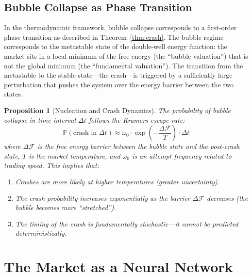 \documentclass[12pt,a4paper]{article}
\newtheorem{proposition}[theorem]{Proposition}
\theoremstyle{definition}
\newcommand{\Prob}{\mathbb{P}}
\begin{document}
\subsection{Bubble Collapse as Phase Transition}

In the thermodynamic framework, bubble collapse corresponds to a first-order phase transition as described in Theorem~\ref{thm:crash}. The bubble regime corresponds to the metastable state of the double-well energy function: the market sits in a local minimum of the free energy (the ``bubble valuation'') that is not the global minimum (the ``fundamental valuation''). The transition from the metastable to the stable state---the crash---is triggered by a sufficiently large perturbation that pushes the system over the energy barrier between the two states.

\begin{proposition}[Nucleation and Crash Dynamics]\label{prop:nucleation}
The probability of bubble collapse in time interval $\Delta t$ follows the Kramers escape rate:
\begin{equation}\label{eq:kramers}
    \Prob(\text{crash in } \Delta t) \approx \omega_0 \cdot \exp\left(-\frac{\Delta \mathcal{F}}{T}\right) \cdot \Delta t
\end{equation}
where $\Delta \mathcal{F}$ is the free energy barrier between the bubble state and the post-crash state, $T$ is the market temperature, and $\omega_0$ is an attempt frequency related to trading speed. This implies that:
\begin{enumerate}[label=(\roman*)]
    \item Crashes are more likely at higher temperatures (greater uncertainty).
    \item The crash probability increases exponentially as the barrier $\Delta \mathcal{F}$ decreases (the bubble becomes more ``stretched'').
    \item The timing of the crash is fundamentally stochastic---it cannot be predicted deterministically.
\end{enumerate}
\end{proposition}



\section{The Market as a Neural Network}\label{sec:neural_network}
\end{document}
